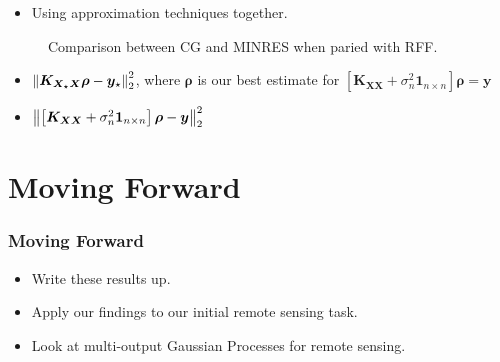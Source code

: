\documentclass[9pt,hyperref={pdfpagelabels=false},xcolor=table]{beamer}
\begin{document}
\begin{frame}
    \begin{itemize}
        \item Using approximation techniques together.
    \end{itemize}
    \begin{figure}
        \centering
        \caption{Comparison between CG and MINRES when paried with RFF.}
    \end{figure}
\end{frame}

\begin{frame}
    \begin{itemize}
        \item $\left\lVert\bm{K_{X_{\star} X}} \bm{\rho} - \bm{y}_{\star}\right\rVert_2^2$, where $\bm{\rho}$ is our best estimate for $\left[ \bm{K_{XX}} + \sigma_n^2 \bm{1}_{n \times n} \right] \bm{\rho} = \bm{y}$
              \bigskip
              \bigskip
              \pause
        \item $\left\lVert\left[ \bm{K_{XX}} + \sigma_n^2 \bm{1}_{n \times n} \right] \bm{\rho} - \bm{y}\right\rVert_2^2$
    \end{itemize}
\end{frame}

\section{Moving Forward}

\begin{frame}
    \frametitle{Moving Forward}
    \begin{itemize}
        \item Write these results up.
              \bigskip
        \item Apply our findings to our initial remote sensing task.
              \bigskip
        \item Look at multi-output Gaussian Processes for remote sensing.
    \end{itemize}
\end{frame}
\end{document}
